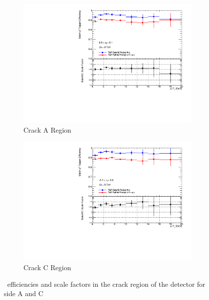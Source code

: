 \begin{figure}[tbhp]
  \centering
  \begin{subfigure}[b]{0.85\textwidth}
    \includegraphics[width=\textwidth]{PartCalibration2012/Plots/SFPlots/Crack_A_smt.pdf}
    \caption{Crack A Region} \label{fig:CalibrationScaleFactorCrackA}
  \end{subfigure}
  
  \begin{subfigure}[b]{0.85\textwidth}
    \includegraphics[width=\textwidth]{PartCalibration2012/Plots/SFPlots/Crack_C_smt.pdf}
    \caption{Crack C Region} \label{fig:CalibrationScaleFactorCrackC}
  \end{subfigure}
  \caption{\xsm\ efficiencies and scale factors in the crack region of the detector for side  A and  C} \label{fig:CalibrationScaleFactorCrack}
\end{figure}

